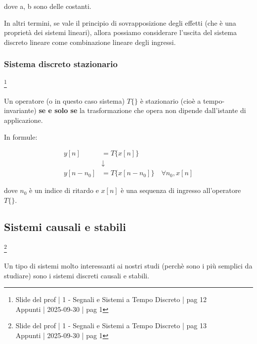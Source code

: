 dove a, b sono delle costanti. \newline 

In altri termini, se vale il principio di sovrapposizione degli effetti (che è una proprietà dei sistemi lineari), 
allora possiamo considerare l'uscita del sistema discreto lineare come combinazione lineare degli ingressi. \newline 

\newpage 

\subsubsection{Sistema discreto stazionario}

\footnote{ 
    Slide del prof | 1 - Segnali e Sistemi a Tempo Discreto | pag 12\\
    Appunti | 2025-09-30 | pag 1
}

Un operatore (o in questo caso sistema) $T \{ \}$ è stazionario (cioè a tempo-invariante) \textbf{se e solo se} 
la trasformazione che opera non dipende dall'istante di applicazione. \newline 

In formule: 

{
    \Large 
    \begin{equation}
        \begin{split}
        y \left[ n\right]
        &= 
        T \{ x \left[ n \right]\}
        \\
        &\downarrow
        \\
        y \left[ n - n_0\right]
        &= 
        T \{ x \left[ n - n_0\right]\}
        \quad
        \forall n_0, x \left[ n\right]
        \end{split}
    \end{equation}
}

dove $n_0$ è un indice di ritardo e $x \left[ n\right]$ è una sequenza di ingresso all'operatore $T \{ \}$. \newline 

\newpage 

\subsection{Sistemi causali e stabili}

\footnote{ 
    Slide del prof | 1 - Segnali e Sistemi a Tempo Discreto | pag 13\\
    Appunti | 2025-09-30 | pag 1
}

Un tipo di sistemi molto interessanti ai nostri studi (perchè sono i più semplici da studiare) 
sono i sistemi discreti causali e stabili. \newline 

